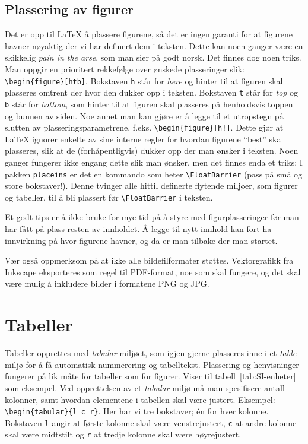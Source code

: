 \documentclass[a4paper,11pt]{article}
\begin{document}
\FloatBarrier

\subsection{Plassering av figurer}
Det er opp til \LaTeX{} å plassere figurene, så det er ingen garanti for at figurene havner nøyaktig der vi har definert dem i teksten. Dette kan noen ganger være en skikkelig \emph{pain in the arse}, som man sier på godt norsk. Det finnes dog noen triks. Man oppgir en prioritert rekkefølge over ønskede plasseringer slik: \texttt{\textbackslash begin\{figure\}[htb]}. Bokstaven \texttt{h} står for \emph{here} og hinter til at figuren skal plasseres omtrent der hvor den dukker opp i teksten. Bokstaven \texttt{t} står for \emph{top} og \texttt{b} står for \emph{bottom}, som hinter til at figuren skal plasseres på henholdsvis toppen og bunnen av siden.
Noe annet man kan gjøre er å legge til et utropstegn på slutten av plasseringsparametrene, f.eks. \texttt{\textbackslash begin\{figure\}[h!]}. Dette gjør at \LaTeX{} ignorer enkelte av sine interne regler for hvordan figurene ``best'' skal plasseres, slik at de (forhåpentligvis) dukker opp der man ønsker i teksten.
Noen ganger fungerer ikke engang dette slik man ønsker, men det finnes enda et triks: I pakken \texttt{placeins} er det en kommando som heter \texttt{\textbackslash FloatBarrier} (pass på små og store bokstaver!). Denne tvinger alle hittil definerte flytende miljøer, som figurer og tabeller, til å bli plassert før \texttt{\textbackslash FloatBarrier} i teksten.

Et godt tips er å ikke bruke for mye tid på å styre med figurplasseringer før man har fått på plass resten av innholdet. Å legge til nytt innhold kan fort ha innvirkning på hvor figurene havner, og da er man tilbake der man startet.

Vær også oppmerksom på at ikke alle bildefilformater støttes. Vektorgrafikk fra Inkscape eksporteres som regel til PDF-format, noe som skal fungere, og det skal være mulig å inkludere bilder i formatene PNG og JPG.


\section{Tabeller}
Tabeller opprettes med \emph{tabular}-miljøet, som igjen gjerne plasseres inne i et \emph{table}-miljø for å få automatisk nummerering og tabelltekst. Plassering og henvisninger fungerer på lik måte for tabeller som for figurer. Viser til tabell~\ref{tab:SI-enheter} som eksempel. Ved opprettelsen av et \emph{tabular}-miljø må man spesifisere antall kolonner, samt hvordan elementene i tabellen skal være justert. Eksempel: \texttt{\textbackslash begin\{tabular\}\{l c r\}}. Her har vi tre bokstaver; én for hver kolonne. Bokstaven \texttt{l} angir at første kolonne skal være venstrejustert, \texttt{c} at andre kolonne skal være midtstilt og \texttt{r} at tredje kolonne skal være høyrejustert.
\end{document}
